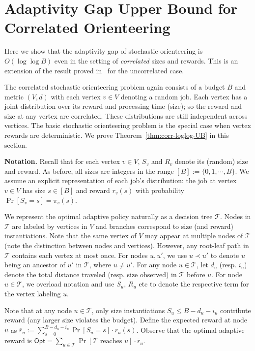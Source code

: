 \documentclass[11pt,letterpaper]{article}
\numberwithin{algorithm}{section}
\newcommand{\T}{\ensuremath{\mathcal{T}}\xspace}
\newcommand{\Opt}{\ensuremath{\mathsf{Opt}}\xspace}
\begin{document}
\section{Adaptivity Gap Upper Bound for Correlated  Orienteering} \label{sec:corr-ad-gap}
Here we show that the adaptivity gap of stochastic orienteering is $O(\log\log B)$ even in the setting of {\em correlated} sizes and rewards. This is an extension of the result proved in~\cite{GKNR12} for the uncorrelated case.

The correlated stochastic orienteering problem again consists of a budget $B$ and metric $(V,d)$ with each vertex $v\in V$ denoting a random job. Each vertex has a joint distribution over its reward and processing time (size); so the reward and size at any vertex are correlated. These distributions are still independent across vertices. The basic stochastic orienteering problem is the special case when vertex rewards are deterministic. We prove Theorem~\ref{thm:corr-loglog-UB} in this section.


{\bf Notation.} Recall that for each vertex $v\in V$, $S_v$ and $R_v$ denote its (random) size and reward. As before, all sizes are integers in the range $[B]:=\{0,1,\cdots,B\}$. We assume an explicit representation of each job's distribution: the job at vertex $v\in V$ has size $s\in[B]$ and reward $r_v(s)$ with probability $\Pr[S_v=s]=\pi_v(s)$.

We represent the optimal adaptive policy naturally as a decision tree \T. Nodes in \T are labeled by vertices in $V$ and branches correspond to size (and reward) instantiations. Note that the same vertex of $V$ may appear at multiple nodes of \T (note the distinction between nodes and vertices). However, any root-leaf path in \T contains each vertex at most once. For nodes $u,u'$, we use $u\prec u'$ to denote $u$ being an ancestor of $u'$ in \T, where $u\ne u'$.
For any node $u\in \T$, let $d_u$ (resp. $i_u$) denote the total distance traveled (resp. size observed) in \T before $u$. For node $u\in \T$, we overload notation and use $S_u$, $R_u$ etc to denote the respective term for the vertex labeling $u$.

\def\rr{\ensuremath{\overline{r}}\xspace}

Note that at any node $u\in\T$, only size instantiations $S_u\le B-d_u-i_u$ contribute reward (any larger size violates the budget).
Define the expected reward at node $u$ as $\rr_u := \sum_{s=0}^{B-d_u-i_u} \Pr[S_u=s]\cdot r_u(s)$. Observe that the optimal adaptive reward is $\Opt=\sum_{u\in\T} \Pr[\T\mbox{ reaches }u]\cdot \rr_u$.
\end{document}
